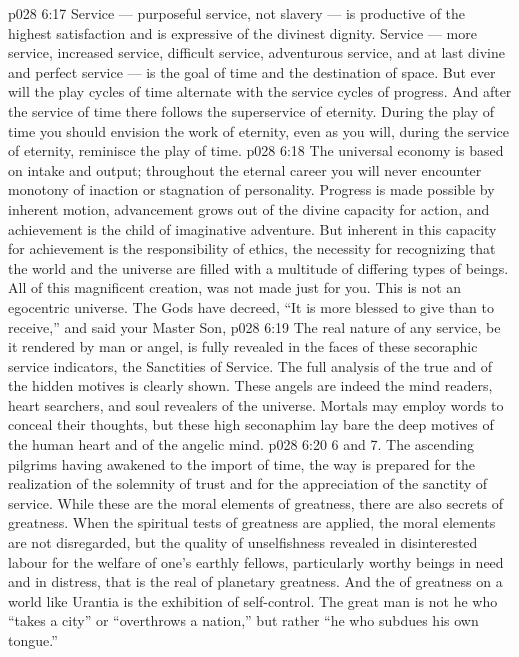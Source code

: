 \vs p028 6:17 Service --- purposeful service, not slavery --- is productive of the highest satisfaction and is expressive of the divinest dignity. Service --- more service, increased service, difficult service, adventurous service, and at last divine and perfect service --- is the goal of time and the destination of space. But ever will the play cycles of time alternate with the service cycles of progress. And after the service of time there follows the superservice of eternity. During the play of time you should envision the work of eternity, even as you will, during the service of eternity, reminisce the play of time.
\vs p028 6:18 \pc The universal economy is based on intake and output; throughout the eternal career you will never encounter monotony of inaction or stagnation of personality. Progress is made possible by inherent motion, advancement grows out of the divine capacity for action, and achievement is the child of imaginative adventure. But inherent in this capacity for achievement is the responsibility of ethics, the necessity for recognizing that the world and the universe are filled with a multitude of differing types of beings. All of this magnificent creation,  was not made just for you. This is not an egocentric universe. The Gods have decreed, “It is more blessed to give than to receive,” and said your Master Son, 
\vs p028 6:19 \pc The real nature of any service, be it rendered by man or angel, is fully revealed in the faces of these secoraphic service indicators, the Sanctities of Service. The full analysis of the true and of the hidden motives is clearly shown. These angels are indeed the mind readers, heart searchers, and soul revealers of the universe. Mortals may employ words to conceal their thoughts, but these high seconaphim lay bare the deep motives of the human heart and of the angelic mind.
\vs p028 6:20 6 and 7.  The ascending pilgrims having awakened to the import of time, the way is prepared for the realization of the solemnity of trust and for the appreciation of the sanctity of service. While these are the moral elements of greatness, there are also secrets of greatness. When the spiritual tests of greatness are applied, the moral elements are not disregarded, but the quality of unselfishness revealed in disinterested labour for the welfare of one’s earthly fellows, particularly worthy beings in need and in distress, that is the real  of planetary greatness. And the  of greatness on a world like Urantia is the exhibition of self\hyp{}control. The great man is not he who “takes a city” or “overthrows a nation,” but rather “he who subdues his own tongue.”
